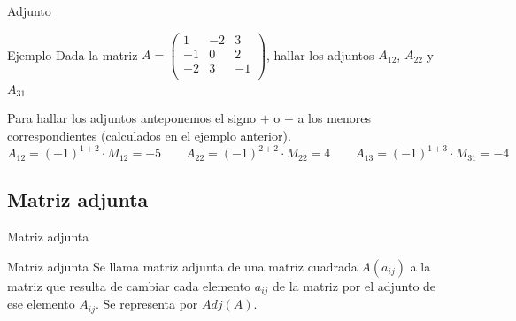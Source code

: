 \documentclass[9pt]{beamer}
\begin{document}
\begin{frame}{Adjunto}
\begin{exampleblock}{Ejemplo}
Dada la matriz $A=\begin{pmatrix} 
 1& -2& 3 \\
 -1& 0& 2 \\
 -2& 3& -1 \\
\end{pmatrix}$, hallar los adjuntos $A_{12}$, $A_{22}$ y $A_{31}$
\end{exampleblock}
\pause
Para hallar los adjuntos anteponemos el signo $+$ o $-$ a los menores correspondientes (calculados en el ejemplo anterior).
\pause
\[
A_{12}=(-1)^{1+2} \cdot M_{12}=-5 \qquad A_{22}=(-1)^{2+2} \cdot M_{22}=4 \qquad A_{13}=(-1)^{1+3} \cdot M_{31}=-4
\]
\end{frame}
\subsection{Matriz adjunta}

\begin{frame}{Matriz adjunta}
\begin{alertblock}{Matriz adjunta}
Se llama matriz adjunta de una matriz cuadrada $A(a_{ij})$ a la matriz que resulta de cambiar cada elemento $a_{ij}$ de la matriz por el adjunto de ese elemento $A_{ij}$. Se representa por $Adj(A)$.
\end{alertblock}

\end{frame}
\end{document}
